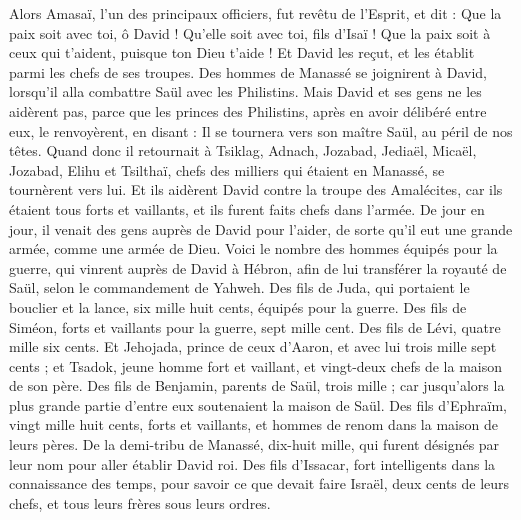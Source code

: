 \begin{multicols}{2}
Alors Amasaï, l’un des principaux officiers, fut revêtu de l’Esprit, et dit : Que la paix soit avec toi, ô David ! Qu'elle soit avec toi, fils d'Isaï ! Que la paix soit à ceux qui t'aident, puisque ton Dieu t'aide ! Et David les reçut, et les établit parmi les chefs de ses troupes.
Des hommes de Manassé se joignirent à David, lorsqu’il alla combattre Saül avec les Philistins. Mais David et ses gens ne les aidèrent pas, parce que les princes des Philistins, après en avoir délibéré entre eux, le renvoyèrent, en disant : Il se tournera vers son maître Saül, au péril de nos têtes.
Quand donc il retournait à Tsiklag, Adnach, Jozabad, Jediaël, Micaël, Jozabad, Elihu et Tsilthaï, chefs des milliers qui étaient en Manassé, se tournèrent vers lui.
Et ils aidèrent David contre la troupe des Amalécites, car ils étaient tous forts et vaillants, et ils furent faits chefs dans l'armée.
De jour en jour, il venait des gens auprès de David pour l'aider, de sorte qu'il eut une grande armée, comme une armée de Dieu.
Voici le nombre des hommes équipés pour la guerre, qui vinrent auprès de David à Hébron, afin de lui transférer la royauté de Saül, selon le commandement de Yahweh.
Des fils de Juda, qui portaient le bouclier et la lance, six mille huit cents, équipés pour la guerre.
Des fils de Siméon, forts et vaillants pour la guerre, sept mille cent.
Des fils de Lévi, quatre mille six cents.
Et Jehojada, prince de ceux d'Aaron, et avec lui trois mille sept cents ;
et Tsadok, jeune homme fort et vaillant, et vingt-deux chefs de la maison de son père.
Des fils de Benjamin, parents de Saül, trois mille ; car jusqu'alors la plus grande partie d’entre eux soutenaient la maison de Saül.
Des fils d'Ephraïm, vingt mille huit cents, forts et vaillants, et hommes de renom dans la maison de leurs pères.
De la demi-tribu de Manassé, dix-huit mille, qui furent désignés par leur nom pour aller établir David roi.
Des fils d'Issacar, fort intelligents dans la connaissance des temps, pour savoir ce que devait faire Israël, deux cents de leurs chefs, et tous leurs frères sous leurs ordres.

\end{multicols}

